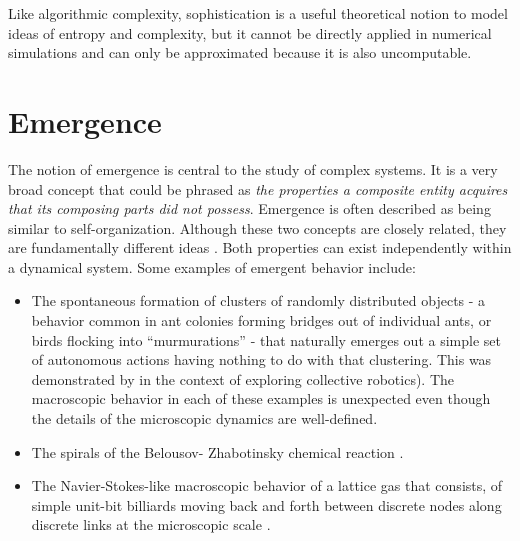 Like algorithmic complexity, sophistication is a useful theoretical notion to
model ideas of entropy and complexity, but it cannot be directly applied in
numerical simulations and can only be approximated because it is also
uncomputable.



\section{Emergence}\label{sec:emergence}
The notion of emergence is central to the study of complex systems. It is a very
broad concept that could be phrased as \emph{the properties a composite entity
  acquires that its composing parts did not possess}. Emergence is often
described as being similar to self-organization. Although these two concepts are
closely related, they are fundamentally different ideas
\parencite{dewolfEmergenceSelfOrganisationDifferent2005}. Both properties can
exist independently within a dynamical system. Some examples of emergent
behavior include:

\begin{itemize}
  \item The spontaneous formation of clusters of randomly distributed objects -
        a behavior common in ant colonies forming bridges out of individual
        ants, or birds flocking into ``murmurations'' - that naturally emerges
        out a simple set of autonomous actions having nothing to do with that
        clustering. This was demonstrated by
        \textcite{beckersFomLocalActions2000} in the context of exploring
        collective robotics). The macroscopic behavior in each of these examples
        is unexpected even though the details of the microscopic dynamics are
        well-defined.
  \item The spirals of the Belousov- Zhabotinsky chemical reaction
        \parencite{tysonBelousovZhabotinskiiReaction2013}.
  \item The Navier-Stokes-like macroscopic behavior of a lattice gas that
        consists, of simple unit-bit billiards moving back and forth between
        discrete nodes along discrete links at the microscopic scale
        \parencite{hasslacherDiscreteFluids1987}.
\end{itemize}

